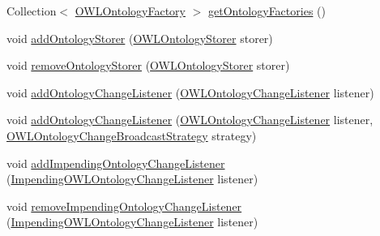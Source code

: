 \begin{DoxyCompactItemize}
\item 
Collection$<$ \hyperlink{interfaceorg_1_1semanticweb_1_1owlapi_1_1model_1_1_o_w_l_ontology_factory}{O\-W\-L\-Ontology\-Factory} $>$ \hyperlink{interfaceorg_1_1semanticweb_1_1owlapi_1_1model_1_1_o_w_l_ontology_manager_a58a0c955cf188eb697ef2110c294714b}{get\-Ontology\-Factories} ()
\item 
void \hyperlink{interfaceorg_1_1semanticweb_1_1owlapi_1_1model_1_1_o_w_l_ontology_manager_a1010052c72dc786e82d3bf3903e7c18b}{add\-Ontology\-Storer} (\hyperlink{interfaceorg_1_1semanticweb_1_1owlapi_1_1model_1_1_o_w_l_ontology_storer}{O\-W\-L\-Ontology\-Storer} storer)
\item 
void \hyperlink{interfaceorg_1_1semanticweb_1_1owlapi_1_1model_1_1_o_w_l_ontology_manager_a3576bc506a48f71cd8a728e18648a7ee}{remove\-Ontology\-Storer} (\hyperlink{interfaceorg_1_1semanticweb_1_1owlapi_1_1model_1_1_o_w_l_ontology_storer}{O\-W\-L\-Ontology\-Storer} storer)
\item 
void \hyperlink{interfaceorg_1_1semanticweb_1_1owlapi_1_1model_1_1_o_w_l_ontology_manager_ae7fcf6f4d3c0d20aa5063ae2db3b7ec4}{add\-Ontology\-Change\-Listener} (\hyperlink{interfaceorg_1_1semanticweb_1_1owlapi_1_1model_1_1_o_w_l_ontology_change_listener}{O\-W\-L\-Ontology\-Change\-Listener} listener)
\item 
void \hyperlink{interfaceorg_1_1semanticweb_1_1owlapi_1_1model_1_1_o_w_l_ontology_manager_a9fd9c90f736ef3cef992b83444c4d45a}{add\-Ontology\-Change\-Listener} (\hyperlink{interfaceorg_1_1semanticweb_1_1owlapi_1_1model_1_1_o_w_l_ontology_change_listener}{O\-W\-L\-Ontology\-Change\-Listener} listener, \hyperlink{interfaceorg_1_1semanticweb_1_1owlapi_1_1model_1_1_o_w_l_ontology_change_broadcast_strategy}{O\-W\-L\-Ontology\-Change\-Broadcast\-Strategy} strategy)
\item 
void \hyperlink{interfaceorg_1_1semanticweb_1_1owlapi_1_1model_1_1_o_w_l_ontology_manager_a112b74acf43d23cacedaf5cae264859a}{add\-Impending\-Ontology\-Change\-Listener} (\hyperlink{interfaceorg_1_1semanticweb_1_1owlapi_1_1model_1_1_impending_o_w_l_ontology_change_listener}{Impending\-O\-W\-L\-Ontology\-Change\-Listener} listener)
\item 
void \hyperlink{interfaceorg_1_1semanticweb_1_1owlapi_1_1model_1_1_o_w_l_ontology_manager_aed31ef29c7ee03b403bbbcd4506d30d0}{remove\-Impending\-Ontology\-Change\-Listener} (\hyperlink{interfaceorg_1_1semanticweb_1_1owlapi_1_1model_1_1_impending_o_w_l_ontology_change_listener}{Impending\-O\-W\-L\-Ontology\-Change\-Listener} listener)
\item 

\end{DoxyCompactItemize}
